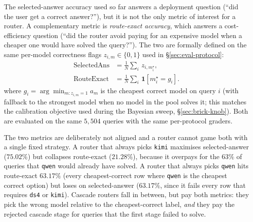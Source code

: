 \documentclass[twocolumn,10pt,a4paper]{article}
\begin{document}
The selected-answer accuracy used so far answers a deployment question (``did the user get a correct answer?''), but it is not the only metric of interest for a router. A complementary metric is \emph{route-exact accuracy}, which answers a cost-efficiency question (``did the router avoid paying for an expensive model when a cheaper one would have solved the query?''). The two are formally defined on the same per-model correctness flags $z_{i,m}\!\in\!\{0,1\}$ used in §\ref{sec:eval-protocol}:
\setlength{\abovedisplayskip}{10pt}\setlength{\belowdisplayskip}{10pt}%
\[
\begin{aligned}
  \mathrm{SelectedAns} &= \tfrac{1}{N}{\textstyle\sum\nolimits_i}\, z_{i, m_i^\star}, \\[-1pt]
  \mathrm{RouteExact}  &= \tfrac{1}{N}{\textstyle\sum\nolimits_i}\, \mathbf{1}[m_i^\star{=}g_i].
\end{aligned}
\]
where $g_i = \arg\min_{m: z_{i,m}=1} a_m$ is the cheapest correct model on query $i$ (with fallback to the strongest model when no model in the pool solves it; this matches the calibration objective used during the Bayesian sweep, §\ref{sec:brick-knob}). Both are evaluated on the same $5{,}504$ queries with the same per-protocol graders.

The two metrics are deliberately not aligned and a router cannot game both with a single fixed strategy. A router that always picks \texttt{kimi} maximises selected-answer ($75.02\%$) but collapses route-exact ($21.28\%$), because it overpays for the $63\%$ of queries that \texttt{qwen} would already have solved. A router that always picks \texttt{qwen} hits route-exact $63.17\%$ (every cheapest-correct row where \texttt{qwen} is the cheapest correct option) but loses on selected-answer ($63.17\%$, since it fails every row that requires \texttt{ds4} or \texttt{kimi}). Cascade routers fall in between, but pay both metrics: they pick the wrong model relative to the cheapest-correct label, \emph{and} they pay the rejected cascade stage for queries that the first stage failed to solve.
\end{document}
